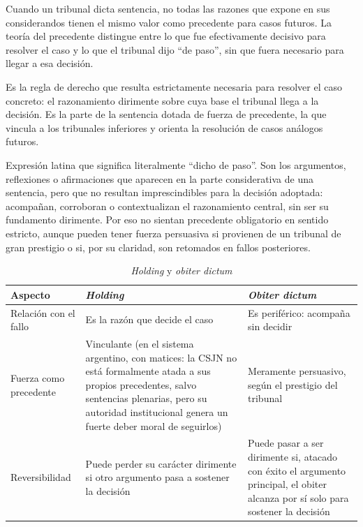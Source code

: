 \documentclass[12pt,oneside]{book}
\begin{document}
Cuando un tribunal dicta sentencia, no todas las razones que expone en sus
considerandos tienen el mismo valor como precedente para casos futuros. La teoría
del precedente distingue entre lo que fue efectivamente decisivo para resolver el
caso y lo que el tribunal dijo ``de paso'', sin que fuera necesario para llegar a
esa decisión.

\begin{defbox}
Es la regla de derecho que resulta estrictamente necesaria para resolver el caso
concreto: el razonamiento dirimente sobre cuya base el tribunal llega a la
decisión. Es la parte de la sentencia dotada de fuerza de precedente, la que
vincula a los tribunales inferiores y orienta la resolución de casos análogos
futuros.
\end{defbox}

\begin{defbox}
Expresión latina que significa literalmente ``dicho de paso''. Son los argumentos,
reflexiones o afirmaciones que aparecen en la parte considerativa de una sentencia,
pero que no resultan imprescindibles para la decisión adoptada: acompañan,
corroboran o contextualizan el razonamiento central, sin ser su fundamento
dirimente. Por eso no sientan precedente obligatorio en sentido estricto, aunque
pueden tener fuerza persuasiva si provienen de un tribunal de gran prestigio o si,
por su claridad, son retomados en fallos posteriores.
\end{defbox}

\begin{table}[H]
\centering
\caption{\textit{Holding} y \textit{obiter dictum}}
\begin{tabularx}{\textwidth}{@{}lXX@{}}
\toprule
\textbf{Aspecto} & \textbf{\textit{Holding}} & \textbf{\textit{Obiter dictum}} \\
\midrule
Relación con el fallo & Es la razón que decide el caso & Es periférico: acompaña
sin decidir \\
Fuerza como precedente & Vinculante (en el sistema argentino, con matices: la
CSJN no está formalmente atada a sus propios precedentes, salvo sentencias
plenarias, pero su autoridad institucional genera un fuerte deber moral de
seguirlos) & Meramente persuasivo, según el prestigio del tribunal \\
Reversibilidad & Puede perder su carácter dirimente si otro argumento pasa a
sostener la decisión & Puede pasar a ser dirimente si, atacado con éxito el
argumento principal, el obiter alcanza por sí solo para sostener la decisión \\
\bottomrule
\end{tabularx}
\end{table}
\end{document}
